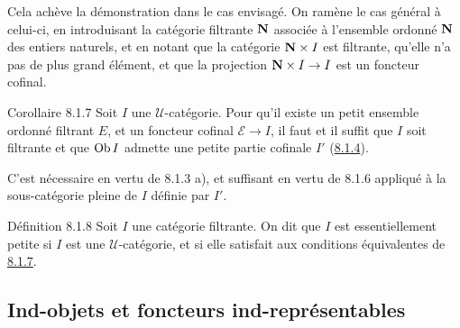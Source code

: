 \documentclass[10pt]{../fichiers-configuration-latex/smfart}
\begin{document}
Cela achève la démonstration dans le cas envisagé. On ramène le cas
général à celui-ci, en introduisant la catégorie filtrante $\mathbf{N}$
associée à l'ensemble ordonné $\mathbf{N}$ des entiers naturels, et en
notant que la catégorie $\mathbf{N}\times I$ est filtrante, qu'elle n'a pas
de plus grand élément, et que la projection $\mathbf{N}\times I\rightarrow
I$ est un foncteur cofinal.

\begin{enonce*}{Corollaire 8.1.7}
Soit $I$ une $𝒰$-catégorie. Pour qu'il existe un petit
ensemble ordonné filtrant $E$, et un foncteur cofinal
$ℰ\rightarrow I$, il faut et il suffit que $I$ soit
filtrante et que $\operatorname{Ob} I$ admette une petite partie cofinale $I'$
(\hyperref[I.sec8.1.4]{8.1.4}).
\end{enonce*}

C'est nécessaire en vertu de 8.1.3 a), et suffisant en vertu de
8.1.6 appliqué à la sous-catégorie pleine de $I$
définie par $I'$.

\begin{enonce*}{Définition 8.1.8}
Soit $I$ une catégorie filtrante. On dit que $I$ est essentiellement
petite si $I$ est une $𝒰$-catégorie, et si elle satisfait
aux conditions équivalentes de \hyperref[I.cor8.1.7]{8.1.7}.
\end{enonce*}

\setcounter{subsection}{1}
\subsection{Ind-objets et foncteurs ind-représentables}
\end{document}
